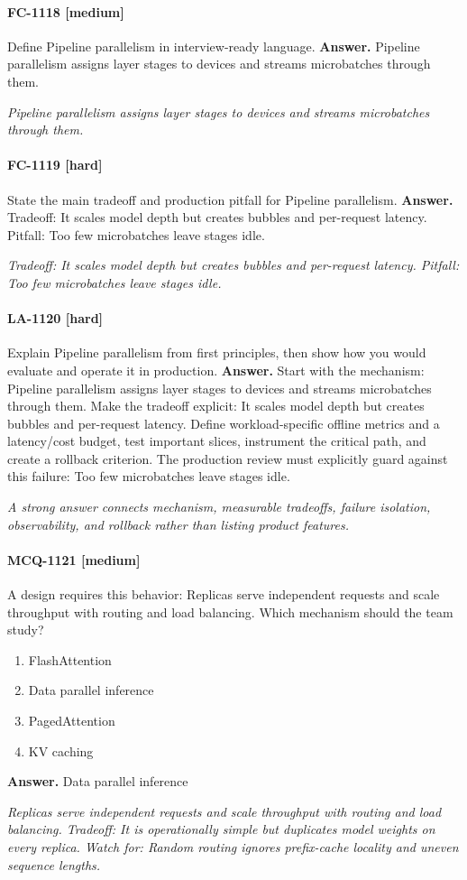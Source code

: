\paragraph{FC-1118 [medium]} Define Pipeline parallelism in interview-ready language.
\noindent\textbf{Answer.} Pipeline parallelism assigns layer stages to devices and streams microbatches through them.
\par\textit{Pipeline parallelism assigns layer stages to devices and streams microbatches through them.}
\paragraph{FC-1119 [hard]} State the main tradeoff and production pitfall for Pipeline parallelism.
\noindent\textbf{Answer.} Tradeoff: It scales model depth but creates bubbles and per-request latency. Pitfall: Too few microbatches leave stages idle.
\par\textit{Tradeoff: It scales model depth but creates bubbles and per-request latency. Pitfall: Too few microbatches leave stages idle.}
\paragraph{LA-1120 [hard]} Explain Pipeline parallelism from first principles, then show how you would evaluate and operate it in production.
\noindent\textbf{Answer.} Start with the mechanism: Pipeline parallelism assigns layer stages to devices and streams microbatches through them. Make the tradeoff explicit: It scales model depth but creates bubbles and per-request latency. Define workload-specific offline metrics and a latency/cost budget, test important slices, instrument the critical path, and create a rollback criterion. The production review must explicitly guard against this failure: Too few microbatches leave stages idle.
\par\textit{A strong answer connects mechanism, measurable tradeoffs, failure isolation, observability, and rollback rather than listing product features.}
\paragraph{MCQ-1121 [medium]} A design requires this behavior: Replicas serve independent requests and scale throughput with routing and load balancing. Which mechanism should the team study?
\begin{enumerate}[label=\Alph*.]
\item FlashAttention
\item Data parallel inference
\item PagedAttention
\item KV caching
\end{enumerate}
\noindent\textbf{Answer.} Data parallel inference
\par\textit{Replicas serve independent requests and scale throughput with routing and load balancing. Tradeoff: It is operationally simple but duplicates model weights on every replica. Watch for: Random routing ignores prefix-cache locality and uneven sequence lengths.}
